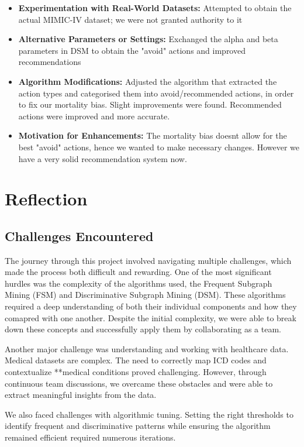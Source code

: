 \documentclass[11pt]{article}
\begin{document}
\begin{itemize}
    \item \textbf{Experimentation with Real-World Datasets:} Attempted to obtain the actual MIMIC-IV dataset; we were not granted authority to it
    \item \textbf{Alternative Parameters or Settings:} Exchanged the alpha and beta parameters in DSM to obtain the "avoid" actions and improved recommendations
    \item \textbf{Algorithm Modifications:} Adjusted the algorithm that extracted the action types and categorised them into avoid/recommended actions, in order to fix our mortality bias. Slight improvements were found. Recommended actions were improved and more accurate.
    \item \textbf{Motivation for Enhancements:} The mortality bias doesnt allow for the best "avoid" actions, hence we wanted to make necessary changes. However we have a very solid recommendation system now.
\end{itemize}

\section{Reflection}
\subsection{Challenges Encountered}

The journey through this project involved navigating multiple challenges, which made the process both difficult and rewarding. One of the most significant hurdles was the complexity of the algorithms used, the Frequent Subgraph Mining (FSM) and Discriminative Subgraph Mining (DSM). These algorithms required a deep understanding of both their individual components and how they comapred with one another. Despite the initial complexity, we were able to break down these concepts and successfully apply them by collaborating as a team.

Another major challenge was understanding and working with healthcare data. Medical datasets are complex. The need to correctly map ICD codes and contextualize **medical conditions proved challenging. However, through continuous team discussions, we overcame these obstacles and were able to extract meaningful insights from the data.

We also faced challenges with algorithmic tuning. Setting the right thresholds to identify frequent and discriminative patterns while ensuring the algorithm remained efficient required numerous iterations. 
\end{document}
